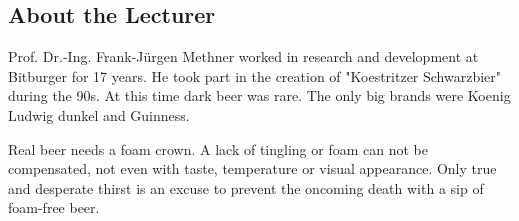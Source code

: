 \documentclass[]{scrartcl}
\begin{document}
\subsection{About the Lecturer}
Prof. Dr.-Ing. Frank-Jürgen Methner worked in research and development at Bitburger for 17 years.
He took part in the creation of "Koestritzer Schwarzbier" during the 90s.
At this time dark beer was rare. The only big brands were Koenig Ludwig dunkel and
Guinness.

Real beer needs a foam crown. A lack of tingling or foam can not be compensated,
not even with taste, temperature or visual appearance. Only true and desperate
thirst is an excuse to prevent the oncoming death with a sip of foam-free beer.
\end{document}
